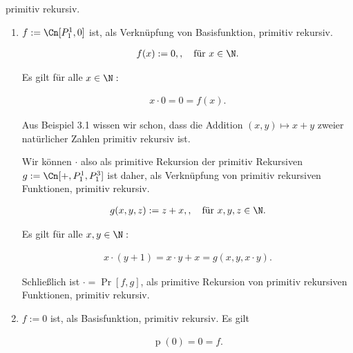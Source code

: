 \begin{exercise}
\begin{enumerate}[label = (\alph*)]
    primitiv rekursiv.

\end{enumerate}

\end{exercise}


\begin{solution}

\phantom{}

\begin{enumerate}[label = (\alph*)]

    \item $f := \Cn[P_1^1, 0]$ ist, als Verknüpfung von Basisfunktion, primitiv rekursiv.

    \begin{align*}
        f(x) := 0,, \quad \text{für}~ x \in \N.
    \end{align*}

    Es gilt für alle $x \in \N:$

    \begin{align*}
        x \cdot 0 = 0 = f(x).
    \end{align*}

    Aus Beispiel 3.1 wissen wir schon, dass die Addition $(x, y) \mapsto x + y$ zweier natürlicher Zahlen primitiv rekursiv ist.

    Wir können $\cdot$ also als primitive Rekursion der primitiv Rekursiven
    $g := \Cn[+, P_1^1, P_1^3]$ ist daher, als Verknüpfung von primitiv rekursiven Funktionen, primitiv rekursiv.

    \begin{align*}
        g(x, y, z) := z + x,, \quad \text{für}~ x, y, z \in \N.
    \end{align*}

    Es gilt für alle $x, y \in \N:$
    
    \begin{align*}
        x \cdot (y + 1) = x \cdot y + x = g(x, y, x \cdot y).
    \end{align*}

    Schließlich ist $\cdot = \Pr[f, g]$, als primitive Rekursion von primitiv rekursiven Funktionen, primitiv rekursiv.

    \item $f := 0$ ist, als Basisfunktion, primitiv rekursiv.
    Es gilt

    \begin{align*}
        \operatorname p(0) = 0 = f.
    \end{align*}


\end{enumerate}
\end{solution}
